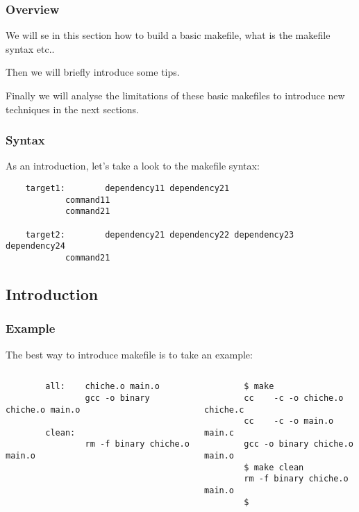
\begin{frame}
  \frametitle{Overview}

  We will se in this section how to build a basic makefile, what is the
  makefile syntax etc..

  \nl

  Then we will briefly introduce some tips.

  \nl

  Finally we will analyse the limitations of these basic makefiles to
  introduce new techniques in the next sections.
\end{frame}


\begin{frame}[containsverbatim]
  \frametitle{Syntax}

  As an introduction, let's take a look to the makefile syntax:

  \begin{verbatim}
    target1:        dependency11 dependency21
            command11
            command21

    target2:        dependency21 dependency22 dependency23 dependency24
            command21
  \end{verbatim}
\end{frame}

%
%

\subsection{Introduction}


\begin{frame}[containsverbatim]
  \frametitle{Example}

  The best way to introduce makefile is to take an example:

  \begin{columns}

    \begin{column}{6cm}
      \begin{verbatim}
        all:    chiche.o main.o
                gcc -o binary chiche.o main.o

        clean:
                rm -f binary chiche.o main.o
      \end{verbatim}
    \end{column}

    \begin{column}{6cm}

      \begin{verbatim}
        $ make
        cc    -c -o chiche.o chiche.c
        cc    -c -o main.o main.c
        gcc -o binary chiche.o main.o
        $ make clean
        rm -f binary chiche.o main.o
        $ 
      \end{verbatim}
    \end{column}

  \end{columns}
\end{frame}

